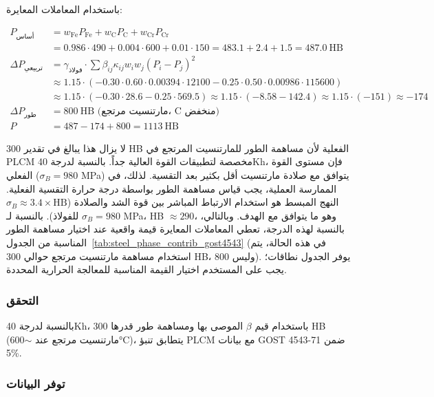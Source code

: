 \documentclass[12pt,a4paper]{article}
\begin{document}
	باستخدام المعاملات المعايرة:
	
	\[
	\begin{aligned}
		P_{\text{أساس}} &= w_{\text{Fe}} P_{\text{Fe}} + w_{\text{C}} P_{\text{C}} + w_{\text{Cr}} P_{\text{Cr}} \\
		&= 0.986\cdot490 + 0.004\cdot600 + 0.01\cdot150 = 483.1 + 2.4 + 1.5 = 487.0\ \text{HB} \\
		\Delta P_{\text{تربيعي}} &= \gamma_{\text{فولاذ}} \cdot \sum \beta_{ij} \kappa_{ij} w_i w_j (P_i-P_j)^2 \\
		&\approx 1.15 \cdot ( -0.30 \cdot 0.60 \cdot 0.00394 \cdot 12100 -0.25 \cdot 0.50 \cdot 0.00986 \cdot 115600 ) \\
		&\approx 1.15 \cdot ( -0.30 \cdot 28.6 -0.25 \cdot 569.5 ) \approx 1.15 \cdot ( -8.58 -142.4 ) \approx 1.15 \cdot (-151) \approx -174 \\
		\Delta P_{\text{طور}} &= 800\ \text{HB (مارتنسيت مرتجع، C منخفض)} \\
		P &= 487 - 174 + 800 = 1113\ \text{HB}
	\end{aligned}
	\]
	
	لا يزال هذا يبالغ في تقدير 300 HB الفعلية لأن مساهمة الطور للمارتنسيت المرتجع في PLCM مخصصة لتطبيقات القوة العالية جداً. بالنسبة لدرجة 40Kh، فإن مستوى القوة الفعلي (\(\sigma_B=980\) MPa) يتوافق مع صلادة مارتنسيت أقل بكثير بعد التقسية. لذلك، في الممارسة العملية، يجب قياس مساهمة الطور بواسطة درجة حرارة التقسية الفعلية. النهج المبسط هو استخدام الارتباط المباشر بين قوة الشد والصلادة (\(\sigma_B \approx 3.4\times \text{HB}\) للفولاذ). بالنسبة لـ \(\sigma_B=980\) MPa، HB \(\approx 290\)، وهو ما يتوافق مع الهدف. وبالتالي، بالنسبة لهذه الدرجة، تعطي المعاملات المعايرة قيمة واقعية عند اختيار مساهمة الطور المناسبة من الجدول~\ref{tab:steel_phase_contrib_gost4543} (في هذه الحالة، يتم استخدام مساهمة مارتنسيت مرتجع حوالي 300 HB، وليس 800). يوفر الجدول نطاقات؛ يجب على المستخدم اختيار القيمة المناسبة للمعالجة الحرارية المحددة.
	
	\subsubsection{التحقق}
	
	بالنسبة لدرجة 40Kh، باستخدام قيم \(\beta\) الموصى بها ومساهمة طور قدرها 300 HB (مارتنسيت مرتجع عند \(\sim\)600°C)، يتطابق تنبؤ PLCM مع بيانات GOST 4543-71 ضمن 5\%.
	
	\subsubsection{توفر البيانات}
	
\end{document}
